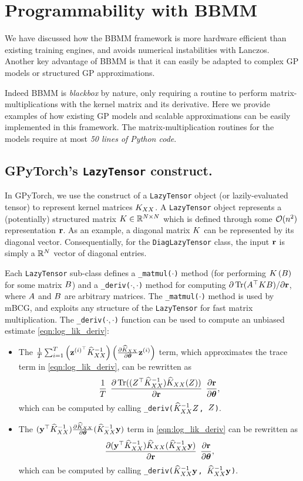 \section{Programmability with BBMM}
\label{sec:programmability}
We have discussed how the BBMM framework is more hardware efficient than existing training engines, and avoids numerical instabilities with Lanczos.
Another key advantage of BBMM is that it can easily be adapted to complex GP models or structured GP approximations.

Indeed BBMM is \emph{blackbox} by nature, only requiring a routine to perform matrix-multiplications with the kernel matrix and its derivative.
Here we provide examples of how existing GP models and scalable approximations can be easily implemented in this framework.
The matrix-multiplication routines for the models require at most \emph{50 lines of Python code}.

\subsection{GPyTorch's {\tt LazyTensor} construct.}
In GPyTorch, we use the construct of a {\tt LazyTensor} object (or lazily-evaluated tensor) to represent kernel matrices $K_{XX}$.
A {\tt LazyTensor} object represents a (potentially) structured matrix $K \in \mathbb{R}^{N \times N}$ which is defined through some $\bigo{n^2}$ representation $\mathbf{r}$.
As an example, a diagonal matrix $K$ can be represented by its diagonal vector.
Consequentially, for the {\tt DiagLazyTensor} class, the input $\mathbf{r}$ is simply a $\mathbb{R}^N$ vector of diagonal entries.

Each {\tt LazyTensor} sub-class defines a {\tt \_matmul($\cdot$)} method (for performing $K \left( B \right)$ for some matrix $B$) and a {\tt \_deriv($\cdot,\cdot$)} method for computing $\partial \tr{ \bA^\top \bK \bB }/{\partial \br}$,
where $A$ and $B$ are arbitrary matrices.
The {\tt \_matmul($\cdot$)} method is used by mBCG, and exploits any structure of the {\tt LazyTensor} for fast matrix multiplication.
The {\tt \_deriv($\cdot,\cdot$)} function can be used to compute an unbiased estimate \cref{eqn:log_lik_deriv}:
\begin{itemize}
  \item The $\frac{1}{T}\sum_{i=1}^{T}\left(\mathbf{z}^{(i)^\top} \widehat{K}_{XX}^{-1}\right)\left(\frac{\partial \widehat{K}_{XX}}{\partial \boldsymbol{\theta}}\mathbf{z}^{(i)} \right)$ term,
    which approximates the trace term in \cref{eqn:log_lik_deriv},
    can be rewritten as
    \[
      \frac{1}{T} \:\: \frac{ \partial \tr{ (\bZ^\top \trainK^{-1}) \trainK (\bZ) }}{ \partial \br } \:\: \frac{ \partial \br }{\partial \btheta},
    \]
    which can be computed by calling {\tt \_deriv($\widehat{K}_{XX}^{-1} Z$, $Z$)}.

  \item The $(\mathbf{y}^\top \widehat{K}_{XX}^{-1}) \frac{\partial \widehat{K}_{XX}}{\partial \boldsymbol{\theta}} (\widehat{K}_{XX}^{-1} \mathbf{y})$ term in \cref{eqn:log_lik_deriv}
    can be rewritten as
    \[
      \frac{\partial (\mathbf{y}^\top \widehat{K}_{XX}^{-1}) \widehat{K}_{XX} (\widehat{K}_{XX}^{-1} \mathbf{y}) }{\partial \mathbf{r}} \:\: \frac{\partial \mathbf{r}}{\partial \boldsymbol{\theta}},
    \]
    which can be computed by calling {\tt \_deriv($\widehat{K}_{XX}^{-1} \mathbf{y}$, $\widehat{K}_{XX}^{-1} \mathbf{y}$)}.
\end{itemize}

